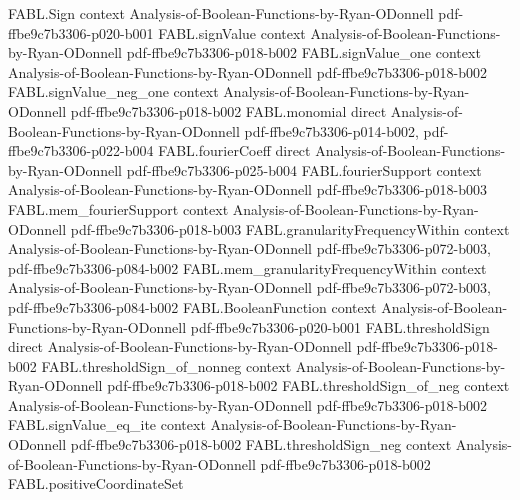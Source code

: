 \begin{theorem}
\label{FABL.majority_odd}
\leanok
{}
\proofstep
  {FABL.Sign}
  {context}
  {Analysis-of-Boolean-Functions-by-Ryan-ODonnell}
  {pdf-ffbe9c7b3306-p020-b001}
\proofstep
  {FABL.signValue}
  {context}
  {Analysis-of-Boolean-Functions-by-Ryan-ODonnell}
  {pdf-ffbe9c7b3306-p018-b002}
\proofstep
  {FABL.signValue_one}
  {context}
  {Analysis-of-Boolean-Functions-by-Ryan-ODonnell}
  {pdf-ffbe9c7b3306-p018-b002}
\proofstep
  {FABL.signValue_neg_one}
  {context}
  {Analysis-of-Boolean-Functions-by-Ryan-ODonnell}
  {pdf-ffbe9c7b3306-p018-b002}
\proofstep
  {FABL.monomial}
  {direct}
  {Analysis-of-Boolean-Functions-by-Ryan-ODonnell}
  {pdf-ffbe9c7b3306-p014-b002,
    pdf-ffbe9c7b3306-p022-b004}
\proofstep
  {FABL.fourierCoeff}
  {direct}
  {Analysis-of-Boolean-Functions-by-Ryan-ODonnell}
  {pdf-ffbe9c7b3306-p025-b004}
\proofstep
  {FABL.fourierSupport}
  {context}
  {Analysis-of-Boolean-Functions-by-Ryan-ODonnell}
  {pdf-ffbe9c7b3306-p018-b003}
\proofstep
  {FABL.mem_fourierSupport}
  {context}
  {Analysis-of-Boolean-Functions-by-Ryan-ODonnell}
  {pdf-ffbe9c7b3306-p018-b003}
\proofstep
  {FABL.granularityFrequencyWithin}
  {context}
  {Analysis-of-Boolean-Functions-by-Ryan-ODonnell}
  {pdf-ffbe9c7b3306-p072-b003,
    pdf-ffbe9c7b3306-p084-b002}
\proofstep
  {FABL.mem_granularityFrequencyWithin}
  {context}
  {Analysis-of-Boolean-Functions-by-Ryan-ODonnell}
  {pdf-ffbe9c7b3306-p072-b003,
    pdf-ffbe9c7b3306-p084-b002}
\proofstep
  {FABL.BooleanFunction}
  {context}
  {Analysis-of-Boolean-Functions-by-Ryan-ODonnell}
  {pdf-ffbe9c7b3306-p020-b001}
\proofstep
  {FABL.thresholdSign}
  {direct}
  {Analysis-of-Boolean-Functions-by-Ryan-ODonnell}
  {pdf-ffbe9c7b3306-p018-b002}
\proofstep
  {FABL.thresholdSign_of_nonneg}
  {context}
  {Analysis-of-Boolean-Functions-by-Ryan-ODonnell}
  {pdf-ffbe9c7b3306-p018-b002}
\proofstep
  {FABL.thresholdSign_of_neg}
  {context}
  {Analysis-of-Boolean-Functions-by-Ryan-ODonnell}
  {pdf-ffbe9c7b3306-p018-b002}
\proofstep
  {FABL.signValue_eq_ite}
  {context}
  {Analysis-of-Boolean-Functions-by-Ryan-ODonnell}
  {pdf-ffbe9c7b3306-p018-b002}
\proofstep
  {FABL.thresholdSign_neg}
  {context}
  {Analysis-of-Boolean-Functions-by-Ryan-ODonnell}
  {pdf-ffbe9c7b3306-p018-b002}
\proofstep
  {FABL.positiveCoordinateSet}

\end{theorem}
